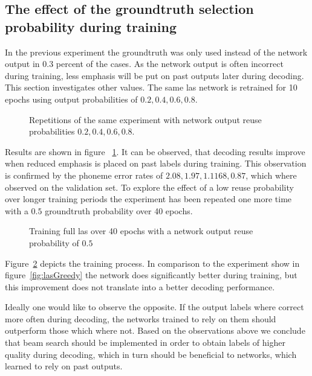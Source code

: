 \subsection{The effect of the groundtruth selection probability during training}
In the previous experiment the groundtruth was only used instead of the network output in 0.3 percent of the cases. As the network output is often incorrect during training, less emphasis will be put on past outputs later during decoding. This section investigates
other values. The same las network is retrained for 10 epochs using output probabilities of $0.2,0.4,0.6,0.8$.
\begin{figure}




\caption{Repetitions of the same experiment with network output reuse probabilities $0.2, 0.4, 0.6, 0.8$. }
\label{fig:lasGreedy2468}
\end{figure}
Results are shown in figure ~\ref{fig:lasGreedy2468}. It can be observed, that decoding results improve when reduced emphasis is placed on past labels during training. This observation is confirmed by the phoneme error rates of $2.08, 1.97, 1.1168, 0.87$, which where observed on the validation set.
To explore the effect of a low reuse probability over longer training periods the experiment has been repeated one more time with a $0.5$ groundtruth probability over 40 epochs.
\begin{figure}


\caption{Training full las over 40 epochs with a network output reuse probability of $0.5$}
\label{fig:lasGreedy05}
\end{figure}
Figure~\ref{fig:lasGreedy05} depicts the training process. In comparison to the experiment show in figure~\ref{fig:lasGreedy} the network does significantly better during training, but
this improvement does not translate into a better decoding performance.

Ideally one would like to observe the opposite. If the output labels where correct more often during decoding, the networks trained to rely on them should outperform those which where not. Based on the observations above we conclude that beam search should be implemented in order to obtain labels of higher quality during decoding, which in turn should be beneficial to networks, which learned to rely on past outputs.




